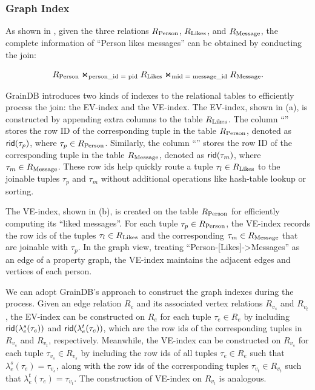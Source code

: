 \subsubsection{Graph Index}
\label{sec:graph-index}

As shown in , given the three relations ${R_{\text{Person}}}$, ${R_{\text{Likes}}}$, and ${R_{\text{Message}}}$, the complete information of ``Person likes messages'' can be obtained by conducting the join:

\[ {R_{\text{Person}}} \Join_\text{person\_id = pid} {\ensuremath R_{\text{Likes}}} \Join_\text{mid = message\_id} {\ensuremath R_{\text{Message}}}. \]

GrainDB introduces two kinds of indexes to the relational tables to efficiently process the join: the EV-index and the VE-index. The EV-index, shown in (a), is constructed by appending extra columns to the table ${R_{\text{Likes}}}$. The column ``'' stores the row ID of the corresponding tuple in the table ${R_{\text{Person}}}$, denoted as ${\mathsf{rid}}(\tau_{p})$, where $\tau_{p} \in {\ensuremath R_{\text{Person}}}$. Similarly, the column ``'' stores the row ID of the corresponding tuple in the table ${R_{\text{Message}}}$, denoted as ${\mathsf{rid}}(\tau_{m})$, where $\tau_{m} \in {\ensuremath R_{\text{Message}}}$. These row ids help quickly route a tuple $\tau_{l} \in {\ensuremath R_{\text{Likes}}}$ to the joinable tuples $\tau_{p}$ and $\tau_{m}$ without additional operations like hash-table lookup or sorting.

The VE-index, shown in (b), is created on the table ${R_{\text{Person}}}$ for efficiently computing its ``liked messages''. For each tuple $\tau_{p} \in {\ensuremath R_{\text{Person}}}$, the VE-index records the row ids of the tuples $\tau_{l} \in {\ensuremath R_{\text{Likes}}}$ and the corresponding $\tau_{m} \in {\ensuremath R_{\text{Message}}}$ that are joinable with $\tau_{p}$. In the graph view, treating ``Person-[Likes]->Messages'' as an edge of a property graph, the VE-index maintains the adjacent edges and vertices of each person. 

We can adopt GrainDB's approach to construct the graph indexes during the \rgmapping process. Given an edge relation $R_e$ and its associated vertex relations $R_{v_s}$ and $R_{v_t}$, the EV-index can be constructed on $R_e$ for each tuple $\tau_e \in R_e$ by including ${\mathsf{rid}}(\lambda_e^s(\tau_e))$ and ${\mathsf{rid}}(\lambda_e^t(\tau_e))$, which are the row ids of the corresponding tuples in $R_{v_s}$ and $R_{v_t}$, respectively. Meanwhile, the VE-index can be constructed on $R_{v_s}$ for each tuple $\tau_{v_s} \in R_{v_s}$ by including the row ids of all tuples $\tau_e \in R_e$ such that $\lambda_e^s(\tau_e) = \tau_{v_s}$, along with the row ids of the corresponding tuples $\tau_{v_t} \in R_{v_t}$ such that $\lambda_e^t(\tau_e) = \tau_{v_t}$.
The construction of VE-index on $R_{v_t}$ is analogous.

